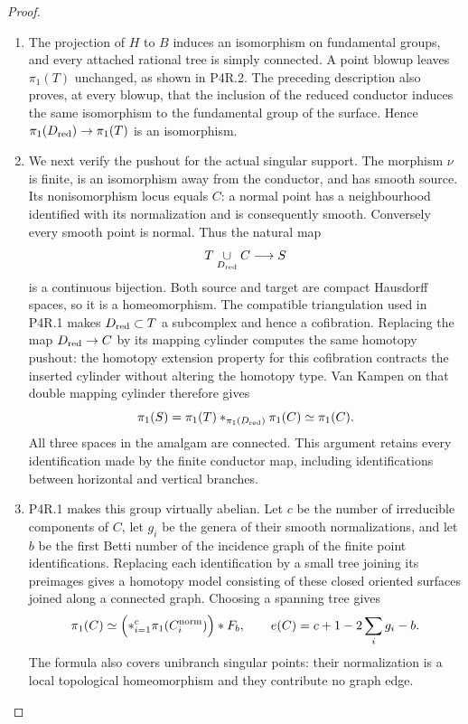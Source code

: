 \begin{proof}
\begin{enumerate}[label={$\langle1\rangle$\arabic*.},leftmargin=*]
\item The projection of $H$ to $B$ induces an isomorphism on
fundamental groups, and every attached rational tree
is simply connected. A point blowup leaves
$\pi_1(T)$ unchanged, as shown in P4R.2. The preceding
description also proves, at every blowup, that the
inclusion of the reduced conductor induces the same
isomorphism to the fundamental group of the surface.
Hence $\pi_1(D_{\rm red})\to\pi_1(T)$ is an
isomorphism.

\item We next verify the pushout for the actual singular
support. The morphism $\nu$ is finite, is an
isomorphism away from the conductor, and has smooth
source. Its nonisomorphism locus equals $C$: a normal
point has a neighbourhood identified with its
normalization and is consequently smooth. Conversely
every smooth point is normal. Thus the natural map
\[
 T\underset{D_{\rm red}}{\cup}C\longrightarrow S
\]
is a continuous bijection. Both source and target are
compact Hausdorff spaces, so it is a homeomorphism.
The compatible triangulation used in P4R.1 makes
$D_{\rm red}\subset T$ a subcomplex and hence a
cofibration. Replacing the map $D_{\rm red}\to C$ by
its mapping cylinder computes the same homotopy
pushout: the homotopy extension property for this
cofibration contracts the inserted cylinder without
altering the homotopy type. Van Kampen on that double
mapping cylinder therefore gives
\[
 \pi_1(S)=\pi_1(T)
       *_{\pi_1(D_{\rm red})}\pi_1(C)
       \simeq\pi_1(C).
\]
All three spaces in the amalgam are connected. This
argument retains every identification made by the
finite conductor map, including identifications
between horizontal and vertical branches.

\item P4R.1 makes this group virtually abelian. Let $c$ be
the number of irreducible components of $C$, let
$g_i$ be the genera of their smooth normalizations,
and let $b$ be the first Betti number of the incidence
graph of the finite point identifications. Replacing
each identification by a small tree joining its
preimages gives a homotopy model consisting of these
closed oriented surfaces joined along a connected
graph. Choosing a spanning tree gives
\[
 \pi_1(C)\simeq
   \Bigl(*_{i=1}^{c}\pi_1(C_i^{\rm norm})\Bigr)*F_b,
 \qquad
 e(C)=c+1-2\sum_i g_i-b.
\]
The formula also covers unibranch singular points:
their normalization is a local topological
homeomorphism and they contribute no graph edge.


\end{enumerate}
\end{proof}
